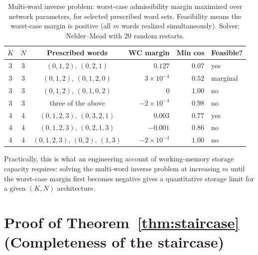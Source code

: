 \documentclass[12pt]{article}
\begin{document}
\begin{table}[ht]
\centering
\caption{Multi-word inverse problem: worst-case admissibility margin maximized over network parameters, for selected prescribed word sets. Feasibility means the worst-case margin is positive (all $m$ words realized simultaneously). Solver: Nelder--Mead with 20 random restarts.}
\label{tab:multi-word}
\small
\begin{tabular}{cccrrl}
\toprule
$K$ & $N$ & Prescribed words & WC margin & Min cos & Feasible? \\
\midrule
3 & 3 & $(0,1,2),\,(0,2,1)$ & $0.127$ & $0.07$ & yes \\
3 & 3 & $(0,1,2),\,(0,1,2,0)$ & $3{\times}10^{-4}$ & $0.52$ & marginal \\
3 & 3 & $(0,1,2),\,(0,1,0,2)$ & $0$ & $1.00$ & no \\
3 & 3 & three of the above & $-2{\times}10^{-4}$ & $0.98$ & no \\
4 & 4 & $(0,1,2,3),\,(0,3,2,1)$ & $0.003$ & $0.77$ & yes \\
4 & 4 & $(0,1,2,3),\,(0,2,1,3)$ & $-0.001$ & $0.86$ & no \\
4 & 4 & $(0,1,2,3),\,(0,2),\,(1,3)$ & $-2{\times}10^{-4}$ & $1.00$ & no \\
\bottomrule
\end{tabular}
\end{table}

Practically, this is what an engineering account of working-memory storage capacity requires: solving the multi-word inverse problem at increasing $m$ until the worst-case margin first becomes negative gives a quantitative storage limit for a given $(K,N)$ architecture.





\section{Proof of Theorem~\ref{thm:staircase} (Completeness of the staircase)}\label{app:staircase-proof}
\end{document}
